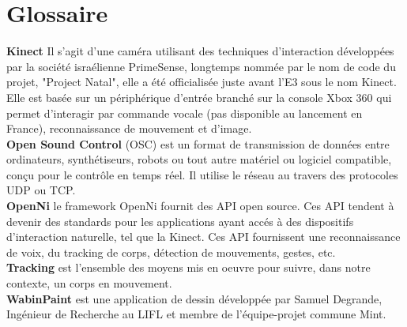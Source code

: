 \chapter{Glossaire}

\textbf{Kinect} Il s'agit d'une caméra utilisant des techniques d'interaction
développées par la société israélienne
PrimeSense, longtemps nommée par
le nom de code du projet, "Project Natal", elle a été officialisée juste avant l'E3 sous le nom Kinect. Elle est basée sur un périphérique d'entrée
branché sur la console Xbox 360 qui permet d'interagir par commande vocale
(pas disponible au lancement en France), reconnaissance de mouvement et
d'image.\\

\textbf{Open Sound Control} (OSC) est un format de transmission de données
entre ordinateurs, synthétiseurs, robots ou tout autre matériel ou logiciel
compatible, conçu pour le contrôle en temps réel. Il utilise le réseau au
travers des protocoles UDP ou TCP.\\

\textbf{OpenNi} le framework OpenNi fournit des API open source. Ces API tendent à devenir des standards pour les applications ayant accés à des
dispositifs d'interaction naturelle, tel que la Kinect. Ces API fournissent
une reconnaissance de voix, du tracking de corps, détection de mouvements,
gestes, etc.\\


\textbf{Tracking} est l'ensemble des moyens mis en oeuvre pour suivre, dans
notre contexte, un corps en mouvement.\\

\textbf{WabinPaint} est une application de dessin développée par Samuel
Degrande, Ingénieur de Recherche au LIFL et membre de l'équipe-projet
commune Mint.\\